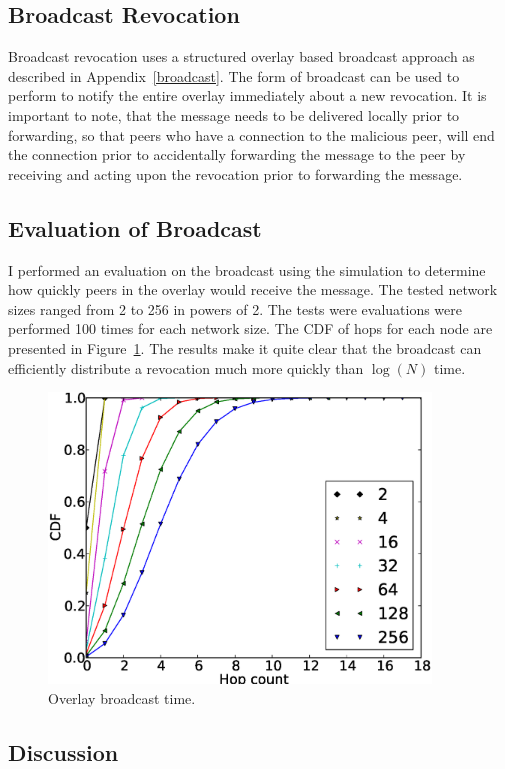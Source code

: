 \subsection{Broadcast Revocation}

Broadcast revocation uses a structured overlay based broadcast approach as
described in Appendix~\ref{broadcast}.  The form of broadcast can be used to
perform to notify the entire overlay immediately about a new revocation.  It is
important to note, that the message needs to be delivered locally prior to
forwarding, so that peers who have a connection to the malicious peer, will end
the connection prior to accidentally forwarding the message to the peer by
receiving and acting upon the revocation prior to forwarding the message.  

\subsection{Evaluation of Broadcast}

I performed an evaluation on the broadcast using the simulation to determine
how quickly peers in the overlay would receive the message.  The tested network
sizes ranged from 2 to 256 in powers of 2.  The tests were evaluations were
performed 100 times for each network size.  The CDF of hops for each node are
presented in Figure~\ref{fig:broadcast_cdf}.  The results make it quite clear that
the broadcast can efficiently distribute a revocation much more quickly than
$\log(N)$ time.

\begin{figure}[ht]
\centering
\includegraphics[width=4in]{figs/broadcast.eps}
\caption{Overlay broadcast time.}
\label{fig:broadcast_cdf}
\end{figure}

\subsection{Discussion}

